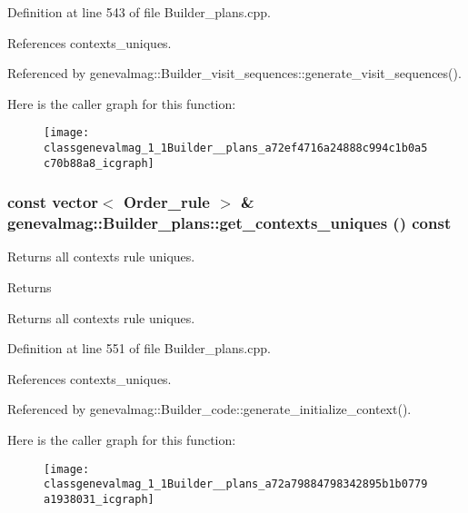 Definition at line 543 of file Builder\_\-plans.cpp.



References contexts\_\-uniques.



Referenced by genevalmag::Builder\_\-visit\_\-sequences::generate\_\-visit\_\-sequences().



Here is the caller graph for this function:\nopagebreak
\begin{figure}[H]
\begin{center}
\leavevmode
\texttt{[image: classgenevalmag\_1\_1Builder\_\_plans\_a72ef4716a24888c994c1b0a5c70b88a8\_icgraph]}
\end{center}
\end{figure}


\hypertarget{classgenevalmag_1_1Builder__plans_a72a79884798342895b1b0779a1938031}{
\subsubsection[{get\_\-contexts\_\-uniques}]{\setlength{\rightskip}{0pt plus 5cm}const vector$<$ {\bf Order\_\-rule} $>$ \& genevalmag::Builder\_\-plans::get\_\-contexts\_\-uniques () const}}
\label{classgenevalmag_1_1Builder__plans_a72a79884798342895b1b0779a1938031}
Returns all contexts rule uniques. \begin{DoxyReturn}{Returns}

\end{DoxyReturn}
Returns all contexts rule uniques. 

Definition at line 551 of file Builder\_\-plans.cpp.



References contexts\_\-uniques.



Referenced by genevalmag::Builder\_\-code::generate\_\-initialize\_\-context().



Here is the caller graph for this function:\nopagebreak
\begin{figure}[H]
\begin{center}
\leavevmode
\texttt{[image: classgenevalmag\_1\_1Builder\_\_plans\_a72a79884798342895b1b0779a1938031\_icgraph]}
\end{center}
\end{figure}


